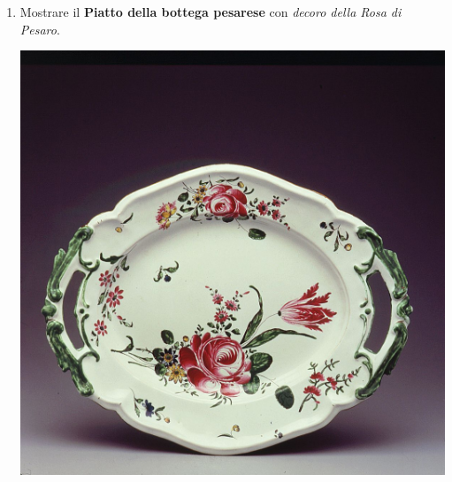 \documentclass[12pt,a4paper]{article}
\begin{document}
\begin{enumerate}
	\item Mostrare il \textbf{Piatto della bottega pesarese} con \textit{decoro della Rosa di Pesaro}.\par
	\begin{minipage}{\linewidth}
		\centering
		\includegraphics[]{Piatto_pesaro.jpg}
	\end{minipage}
	

\end{enumerate}
\end{document}
